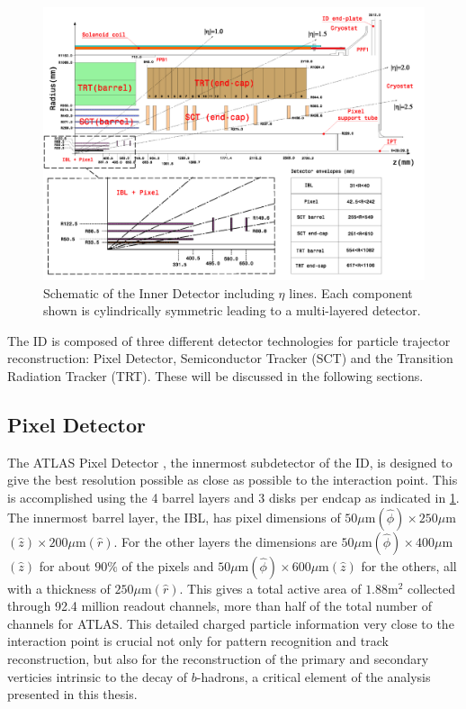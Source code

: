 \begin{figure}[!htbp]
  \begin{center}
    \includegraphics[width=0.8\linewidth]{figures/atlas/inner_detector_schematic}
    \caption{ \cite{PIX-2018-001} Schematic of the Inner Detector including $\eta$
lines.  Each component shown is cylindrically symmetric leading to a
multi-layered detector.}
    \label{fig:inner_detector_schematic}
  \end{center}
\end{figure}

The ID is composed of three different detector technologies for particle
trajector reconstruction: Pixel Detector, Semiconductor Tracker (SCT) and
the Transition Radiation Tracker (TRT).  These will be discussed in the
following sections. 

\subsection{Pixel Detector}

The ATLAS Pixel Detector \cite{PERF-2007-01}, the innermost subdetector of the ID, is designed to
give the best resolution possible as close as possible to the interaction point.
This is accomplished using the 4 barrel layers and 3 disks per endcap as
indicated in \cref{fig:inner_detector_schematic}. The innermost barrel
layer, the IBL, has pixel dimensions of $50\mu $m$(\hat{\phi}) \times 250\mu $m$
(\hat{z}) \times 200\mu $m$(\hat{r})$.  For the other layers the dimensions are
$50\mu $m$(\hat{\phi}) \times 400\mu $m$(\hat{z})$ for about $90\%$ of the pixels
and $50\mu $m$(\hat{\phi}) \times 600\mu $m$(\hat{z})$ for the others, all with a
thickness of $250\mu $m$(\hat{r})$.  This gives a total active area of $1.88 $m$^2$
collected through 92.4 million readout channels, more than half of the total
number of channels for ATLAS. This detailed charged particle information very
close to the interaction point is crucial not only for pattern recognition and
track reconstruction, but also for the reconstruction of the primary and
secondary verticies intrinsic to the decay of $b$-hadrons, a critical element
of the analysis presented in this thesis.

